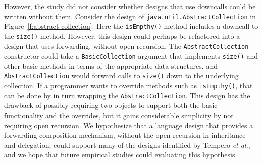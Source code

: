 \documentclass[preprint]{sigplanconf}
\begin{document}
However, the study did not consider whether designs that use
downcalls could be written without them.  Consider the design
of \texttt{java.util.AbstractCollection} in
Figure~\ref{f:abstract-collection}.  Here the \texttt{isEmpthy()}
method includes a downcall to the \texttt{size()} method.
However, this design could perhaps be refactored into a design
that uses forwarding, without open recursion.  The
\texttt{AbstractCollection} constructor could take a
\texttt{BasicCollection} argument that implements \texttt{size()}
and other basic methods in terms of the appropriate data
structures, and \texttt{AbstractCollection} would forward calls
to \texttt{size()} down to the underlying collection.  If a
programmer wants to override methods such as \texttt{isEmpthy()},
that can be done by in turn wrapping the \texttt{AbstractCollection}.
This design has the drawback of possibly requiring two objects to
support both the basic functionality and the overrides, but it gains
considerable simplicity by not requiring open recursion.  We
hypothesize that a language design that provides a forwarding
composition mechanism, without the open recursion in inheritance
and delegation, could support many of the designs identified by
Tempero \textit{et al.}, and we hope that future empirical studies
could evaluating this hypothesis.






\end{document}
